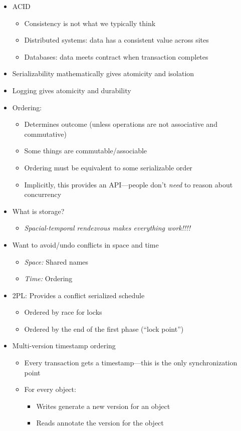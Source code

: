\documentclass[10pt]{article}
\begin{document}
\begin{itemize}
\item ACID
\begin{itemize}
\item Consistency is not what we typically think
\item Distributed systems: data has a consistent value across sites
\item Databases: data meets contract when transaction completes
\end{itemize}
\item Serializability mathematically gives atomicity and isolation
\item Logging gives atomicity and durability
\item Ordering:
\begin{itemize}
\item Determines outcome (unless operations are not associative and commutative)
\item Some things are commutable/associable
\item Ordering must be equivalent to some serializable order
\item Implicitly, this provides an API---people don't \emph{need} to reason about concurrency
\end{itemize}
\item What is storage?
\begin{itemize}
\item \emph{Spacial-temporal rendezvous makes everything work!!!!}
\end{itemize}
\item Want to avoid/undo conflicts in space and time
\begin{itemize}
\item \emph{Space:} Shared names
\item \emph{Time:} Ordering
\end{itemize}
\item 2PL: Provides a conflict serialized schedule
\begin{itemize}
\item Ordered by race for locks
\item Ordered by the end of the first phase (``lock point'')
\end{itemize}
\item Multi-version timestamp ordering
\begin{itemize}
\item Every transaction gets a timestamp---this is the only synchronization point
\item For every object:
\begin{itemize}
\item Writes generate a new version for an object
\item Reads annotate the version for the object
\end{itemize}
\end{itemize}
\end{itemize}
\end{document}
